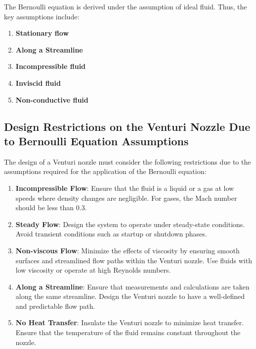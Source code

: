 \documentclass{article}
\begin{document}
The Bernoulli equation is derived under the assumption of ideal fluid. Thus, the key assumptions include:

\begin{enumerate}
    \item \textbf{Stationary flow}
    \item \textbf{Along a Streamline}
    \item \textbf{Incompressible fluid}
    \item \textbf{Inviscid fluid}
    \item \textbf{Non-conductive fluid}
    
\end{enumerate}

\subsection{Design Restrictions on the Venturi Nozzle Due to Bernoulli Equation Assumptions}

The design of a Venturi nozzle must consider the following restrictions due to the assumptions required for the application of the Bernoulli equation:

\begin{enumerate}
    \item \textbf{Incompressible Flow}: Ensure that the fluid is a liquid or a gas at low speeds where density changes are negligible. For gases, the Mach number should be less than 0.3.

    \item \textbf{Steady Flow}: Design the system to operate under steady-state conditions. Avoid transient conditions such as startup or shutdown phases.

    \item \textbf{Non-viscous Flow}: Minimize the effects of viscosity by ensuring smooth surfaces and streamlined flow paths within the Venturi nozzle. Use fluids with low viscosity or operate at high Reynolds numbers.

    \item \textbf{Along a Streamline}: Ensure that measurements and calculations are taken along the same streamline. Design the Venturi nozzle to have a well-defined and predictable flow path.

    \item \textbf{No Heat Transfer}: Insulate the Venturi nozzle to minimize heat transfer. Ensure that the temperature of the fluid remains constant throughout the nozzle.
    
\end{enumerate}
\end{document}
